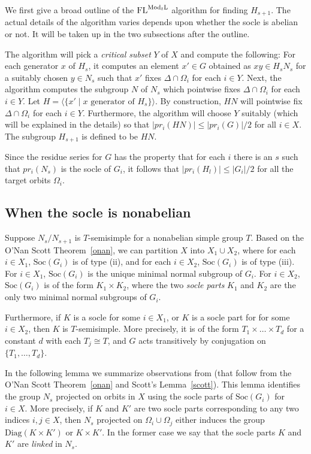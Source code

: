 \documentclass[11pt]{article}
\newcommand{\ModKL}[1]{\ensuremath{\mathrm{Mod}_{#1}\mathrm{L}}}
\newcommand{\FL}{\mbox{\rm FL}}
\renewcommand{\angle}[1]{\langle #1\rangle}
\newcommand{\Soc}[1]{\ensuremath{\mathrm{Soc}\left(#1\right)}}
\newcommand{\Diag}[1]{\ensuremath{\mathrm{Diag}\left({#1}\right)}}
\newcommand{\pr}[2]{\ensuremath{pr_{#1}\left({#2}\right)}}
\begin{document}
We first give a broad outline of the $\FL^{\ModKL{t}}$ algorithm for
finding $H_{s+1}$. The actual details of the algorithm varies depends
upon whether the socle is abelian or not. It will be taken up in the
two subsections after the outline.

The algorithm will pick a \emph{critical subset} $Y$ of $X$ and
compute the following: For each generator $x$ of $H_s$, it computes an
element $x'\in G$ obtained as $xy\in H_sN_s$ for a suitably chosen
$y\in N_s$ such that $x'$ fixes $\Delta\cap \Omega_i$ for each $i\in
Y$. Next, the algorithm computes the subgroup $N$ of $N_s$ which
pointwise fixes $\Delta\cap \Omega_i$ for each $i\in Y$. Let
$H=\angle{\{x'\mid x\textrm{ generator of } H_s\}}$. By construction,
$HN$ will pointwise fix $\Delta\cap \Omega_i$ for each $i\in
Y$. Furthermore, the algorithm will choose $Y$ suitably (which will be
explained in the details) so that $|\pr{i}{HN}|\leq |\pr{i}{G}|/2$ for
all $i\in X$.  The subgroup $H_{s+1}$ is defined to be $HN$.

Since the residue series for $G$ has the property that for each $i$
there is an $s$ such that $\pr{i}{N_s}$ is the socle of $G_i$, it
follows that $|\pr{i}{H_l}|\leq |G_i|/2$ for all the target orbits
$\Omega_i$.

\subsection*{When the socle is nonabelian}

Suppose $N_s/N_{s+1}$ is $T$-semisimple for a nonabelian simple group
$T$. Based on the O'Nan Scott Theorem~\ref{onan}, we can partition $X$
into $X_1\cup X_2$, where for each $i\in X_1$, $\Soc{G_i}$ is of type
(ii), and for each $i\in X_2$, $\Soc{G_i}$ is of type (iii). For $i\in
X_1$, $\Soc{G_i}$ is the unique minimal normal subgroup of $G_i$. For
$i\in X_2$, $\Soc{G_i}$ is of the form $K_1\times K_2$, where the two
\emph{socle parts} $K_1$ and $K_2$ are the only two minimal normal
subgroups of $G_i$.

Furthermore, if $K$ is a socle for some $i\in X_1$, or $K$ is a socle
part for for some $i\in X_2$, then $K$ is $T$-semisimple. More
precisely, it is of the form $T_1\times\ldots\times T_d$ for a
constant $d$ with each $T_j\cong T$, and $G$ acts transitively by
conjugation on $\{T_1,\ldots,T_d\}$.

In the following lemma we summarize observations from \cite{luks}
(that follow from the O'Nan Scott Theorem~\ref{onan} and Scott's
Lemma~\ref{scott}). This lemma identifies the group $N_s$ projected on
orbits in $X$ using the socle parts of $\Soc{G_i}$ for $i\in X$.  More
precisely, if $K$ and $K'$ are two socle parts corresponding to any
two indices $i, j\in X$, then $N_s$ projected on $\Omega_i\cup
\Omega_j$ either induces the group $\Diag{K\times K'}$ or $K\times
K'$. In the former case we say that the socle parts $K$ and $K'$ are
\emph{linked} in $N_s$.
\end{document}
